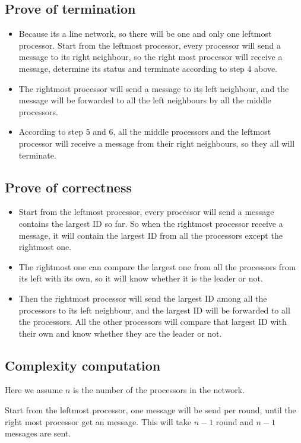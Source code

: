 \documentclass[paper=a4, fontsize=11pt]{scrartcl} %
\numberwithin{equation}{section} %
\numberwithin{figure}{section} %
\numberwithin{table}{section} %
\begin{document}
\subsection*{Prove of termination}
\begin{itemize}
	\item Because its a line network, so there will be one and only one leftmost processor. Start from the leftmost processor, every processor will send a message to its right neighbour, so the right most processor will receive a message, determine its status and terminate according to step 4 above. 
	\item The rightmost processor will send a message to its left neighbour, and the message will be forwarded to all the left neighbours by all the middle processors. 
	\item According to step 5 and 6, all the middle processors and the leftmost processor will receive a message from their right neighbours, so they all will terminate.
\end{itemize}
\subsection*{Prove of correctness}
\begin{itemize}
	\item Start from the leftmost processor, every processor will send a message contains the largest ID so far. So when the rightmost processor receive a message, it will contain the largest ID from all the processors except the rightmost one. 
	\item The rightmost one can compare the largest one from all the processors from its left with its own, so it will know whether it is the leader or not. 
	\item Then the rightmost processor will send the largest ID among all the processors to its left neighbour, and the largest ID will be forwarded to all the processors. All the other processors will compare that largest ID with their own and know whether they are the leader or not. 
\end{itemize}
\subsection*{Complexity computation}
Here we assume $n$ is the number of the processors in the network.

Start from the leftmost processor, one message will be send per round, until the right most processor get an message. This will take $n - 1$ round and $n - 1$ messages are sent.
\end{document}
